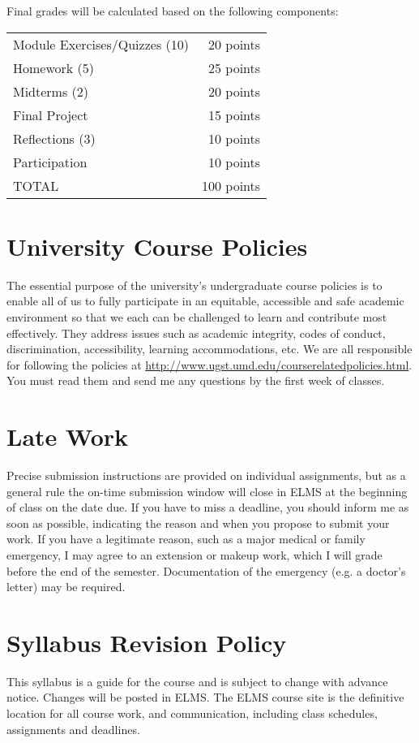 \documentclass[11pt]{article}
\begin{document}
Final grades will be calculated based on the following components:

\hspace*{.5in}
\begin{tabular}{lr}
	Module Exercises/Quizzes (10) & 20 points \\
	Homework (5) & 25 points \\
	Midterms (2) & 20 points \\
	Final Project & 15 points \\
	Reflections (3) & 10 points \\
	Participation & 10 points \\
	\hline
	TOTAL & 100 points \\
\end{tabular}

\section{University Course Policies}
The essential purpose of the university’s undergraduate course policies is to enable all of us to fully participate in an equitable, accessible and safe academic environment so that we each can be challenged to learn and contribute most effectively. They address issues such as academic integrity, codes of conduct, discrimination, accessibility, learning accommodations, etc. We are all responsible for following the policies at \href{http://www.ugst.umd.edu/courserelatedpolicies.html}{http://www.ugst.umd.edu/courserelatedpolicies.html}. You must read them and send me any questions by the first week of classes.

\section{Late Work}
Precise submission instructions are provided on individual assignments, but as a general rule the on-time submission window will close in ELMS at the beginning of class on the date due.  If you have to miss a deadline, you should inform me as soon as possible, indicating the reason and when you propose to submit your work. If you have a legitimate reason, such as a major medical or family emergency, I may agree to an extension or makeup work, which I will grade before the end of the semester. Documentation of the emergency (e.g. a doctor's letter) may be required.

\section{Syllabus Revision Policy}
This syllabus is a guide for the course and is subject to change with advance notice. Changes will be posted in ELMS. The ELMS course site is the definitive location for all course work, and communication, including class schedules, assignments and deadlines.
\end{document}

